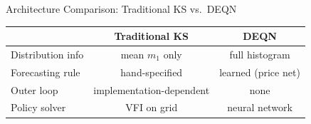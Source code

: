 \documentclass[aspectratio=169,11pt]{beamer}
\newcommand{\emphc}[1]{\textcolor{harvardcrimson}{#1}}
\begin{document}
\begin{frame}{Architecture Comparison: Traditional KS vs.\ DEQN}
\vspace{-0.1em}
\begin{center}
\scriptsize
\begin{tabular}{lcc}
\toprule
& \textbf{Traditional KS} & \textbf{DEQN} \\
\midrule
Distribution info & mean $m_1$ only & \emphc{full histogram} \\
Forecasting rule & hand-specified & \emphc{learned (price net)} \\
Outer loop & implementation-dependent & \emphc{none} \\
Policy solver & VFI on grid & \emphc{neural network} \\
\bottomrule
\end{tabular}
\end{center}
\end{frame}
\end{document}
